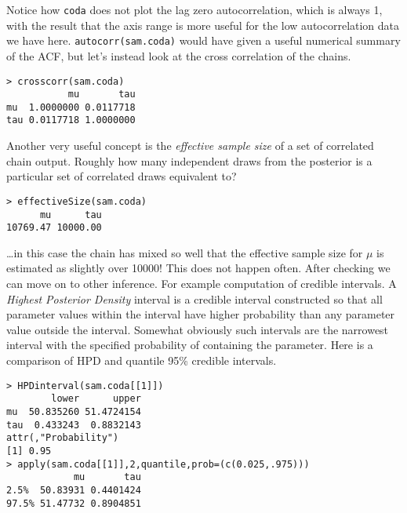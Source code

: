 \documentclass[10pt] {article}
\newcommand{\eps}[3]
{{\begin{center}
 \rotatebox{#1}{\scalebox{#2}{\texttt{[image: \#3]}}}
 \end{center}}
}
\theoremstyle{definition}
\begin{document}
\vspace*{-1cm}

\eps{-90}{.4}{coda-acf.eps}

\noindent Notice how {\tt coda} does not plot the lag zero autocorrelation, which is always 1, with the result that the axis range is more useful for the low autocorrelation data we have here. \lstinline+autocorr(sam.coda)+ would have given a useful numerical summary of the ACF, but let's instead look at the cross correlation of the chains. 
\begin{lstlisting}
> crosscorr(sam.coda)
           mu       tau
mu  1.0000000 0.0117718
tau 0.0117718 1.0000000
\end{lstlisting}
Another very useful concept is the {\em effective sample size} of a set of correlated chain output. Roughly how many independent draws from the posterior is a particular set of correlated draws equivalent to? 
\begin{lstlisting}
> effectiveSize(sam.coda)
      mu      tau 
10769.47 10000.00
\end{lstlisting}
\ldots in this case the chain has mixed so well that the effective sample size for $\mu$ is estimated as slightly over 10000! This does not happen often. After checking we can move on to other inference. For example computation of credible intervals. A {\em Highest Posterior Density} interval is a credible interval constructed so that all parameter values within the interval have higher probability than any parameter value outside the interval. Somewhat obviously such intervals are the narrowest interval with the specified probability of containing the parameter. Here is a comparison of HPD and quantile 95\% credible intervals.  
\begin{lstlisting}
> HPDinterval(sam.coda[[1]])
        lower      upper
mu  50.835260 51.4724154
tau  0.433243  0.8832143
attr(,"Probability")
[1] 0.95
> apply(sam.coda[[1]],2,quantile,prob=(c(0.025,.975)))
            mu       tau
2.5%  50.83931 0.4401424
97.5% 51.47732 0.8904851
\end{lstlisting}
\end{document}
